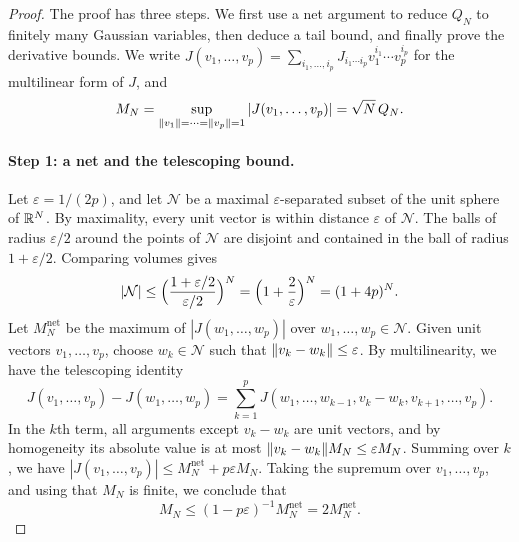 \begin{proof}
The proof has three steps. We first use a net argument to reduce $Q_N$ to finitely many Gaussian variables, then deduce a tail bound, and finally prove the derivative bounds. We write $J(v_1,\dots,v_p)=\sum_{i_1,\ldots,i_p}J_{i_1\cdots i_p}v_1^{i_1}\cdots v_p^{i_p}$ for the multilinear form of $J$, and
\[
 M_N=\sup_{\lVert v_1\rVert=\cdots=\lVert v_p\rVert=1}|J(v_1,\dots,v_p)|=\sqrt N\,Q_N.
\]

\paragraph{Step 1: a net and the telescoping bound.}
Let $\varepsilon=1/(2p)$, and let $\mathcal N$ be a maximal $\varepsilon$-separated subset of the unit sphere of $\mathbb R^N$. By maximality, every unit vector is within distance $\varepsilon$ of $\mathcal N$. The balls of radius $\varepsilon/2$ around the points of $\mathcal N$ are disjoint and contained in the ball of radius $1+\varepsilon/2$. Comparing volumes gives
\[
 |\mathcal N|\le\Bigl(\frac{1+\varepsilon/2}{\varepsilon/2}\Bigr)^N=\Bigl(1+\frac2\varepsilon\Bigr)^N=(1+4p)^N.
\]
Let $M_N^{\mathrm{net}}$ be the maximum of $|J(w_1,\dots,w_p)|$ over $w_1,\dots,w_p\in\mathcal N$. Given unit vectors $v_1,\dots,v_p$, choose $w_k\in\mathcal N$ such that $\lVert v_k-w_k\rVert\le\varepsilon$. By multilinearity, we have the telescoping identity
\[
 J(v_1,\dots,v_p)-J(w_1,\dots,w_p)
 =\sum_{k=1}^pJ(w_1,\dots,w_{k-1},v_k-w_k,v_{k+1},\dots,v_p).
\]
In the $k$th term, all arguments except $v_k-w_k$ are unit vectors, and by homogeneity its absolute value is at most $\lVert v_k-w_k\rVert M_N\le\varepsilon M_N$. Summing over $k$, we have $|J(v_1,\dots,v_p)|\le M_N^{\mathrm{net}}+p\varepsilon M_N$. Taking the supremum over $v_1,\dots,v_p$, and using that $M_N$ is finite, we conclude that
\[
 M_N\le(1-p\varepsilon)^{-1}M_N^{\mathrm{net}}=2M_N^{\mathrm{net}}.
\]


\end{proof}
